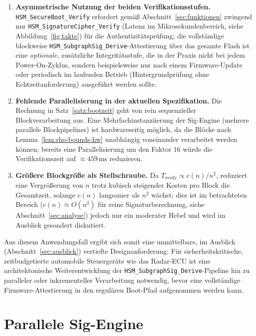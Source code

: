 ﻿\documentclass[a4paper,12pt]{article}
\theoremstyle{definition}
\begin{document}
\begin{enumerate}
	\item \textbf{Asymmetrische Nutzung der beiden Verifikationsstufen.} \texttt{HSM\_SecureBoot\_Verify} erfordert gemäß Abschnitt~\ref{sec:funktionen} zwingend nur \texttt{HSM\_SignatureCipher\_Verify} (Latenz im Mikrosekundenbereich, siehe Abbildung~\ref{fig:takte}) für die Authentizitätsprüfung; die vollständige blockweise \texttt{HSM\_SubgraphSig\_Derive}-Attestierung über das gesamte Flash ist eine \emph{optionale}, zusätzliche Integritätsstufe, die in der Praxis nicht bei jedem Power-On-Zyklus, sondern beispielsweise nur nach einem Firmware-Update oder periodisch im laufenden Betrieb (Hintergrundprüfung ohne Echtzeitanforderung) ausgeführt werden sollte.
	\item \textbf{Fehlende Parallelisierung in der aktuellen Spezifikation.} Die Rechnung in Satz~\ref{satz:bootzeit} geht von rein sequenzieller Blockverarbeitung aus. Eine Mehrfachinstanziierung der Sig-Engine (mehrere parallele Blockpipelines) ist hardwareseitig möglich, da die Blöcke nach Lemma~\ref{lem:rho-bounds-hw} unabhängig voneinander verarbeitet werden können; bereits eine Parallelisierung um den Faktor $16$ würde die Verifikationszeit auf $\approx 459$\,ms reduzieren.
	\item \textbf{Größere Blockgröße als Stellschraube.} Da $T_{\mathrm{verify}} \propto c(n)/n^2$, reduziert eine Vergrößerung von $n$ trotz kubisch steigender Kosten pro Block die Gesamtzeit, solange $c(n)$ langsamer als $n^2$ wächst; dies ist im betrachteten Bereich ($c(n) \approx O(n^2)$ für reine Signaturberechnung, siehe Abschnitt~\ref{sec:analyse}) jedoch nur ein moderater Hebel und wird im Ausblick gesondert diskutiert.
\end{enumerate}

Aus diesem Anwendungsfall ergibt sich somit eine unmittelbare, im Ausblick (Abschnitt~\ref{sec:ausblick}) vertiefte Designanforderung: Für sicherheitskritische, zeitbudgetierte automobile Steuergeräte wie das Radar-ECU ist eine architektonische Weiterentwicklung der \texttt{HSM\_SubgraphSig\_Derive}-Pipeline hin zu paralleler oder inkrementeller Verarbeitung notwendig, bevor eine vollständige Firmware-Attestierung in den regulären Boot-Pfad aufgenommen werden kann.

\section{Parallele Sig-Engine}
\label{sec:parallel}
\end{document}
